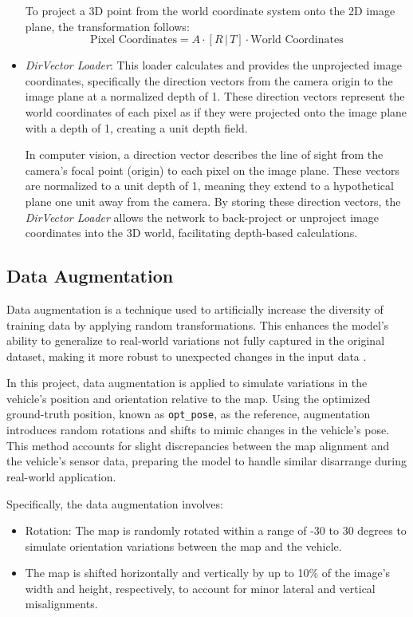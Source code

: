 \begin{itemize}
    To project a 3D point from the world coordinate system onto the 2D image plane, the transformation follows:
    \begin{equation}
        \text{Pixel Coordinates} = A \cdot [R \,|\, T] \cdot \text{World Coordinates}
    \end{equation}
    
    \item \textit{DirVector Loader}: This loader calculates and provides the unprojected image coordinates, specifically the direction vectors from the camera origin to the image plane at a normalized depth of 1. These direction vectors represent the world coordinates of each pixel as if they were projected onto the image plane with a depth of 1, creating a unit depth field.
    
    In computer vision, a direction vector describes the line of sight from the camera’s focal point (origin) to each pixel on the image plane. These vectors are normalized to a unit depth of 1, meaning they extend to a hypothetical plane one unit away from the camera. By storing these direction vectors, the \textit{DirVector Loader} allows the network to back-project or unproject image coordinates into the 3D world, facilitating depth-based calculations.

\end{itemize}

\subsection{Data Augmentation} 

Data augmentation is a technique used to artificially increase the diversity of training data by applying random transformations. This enhances the model’s ability to generalize to real-world variations not fully captured in the original dataset, making it more robust to unexpected changes in the input data \cite{MUMUNI2022100258}.

In this project, data augmentation is applied to simulate variations in the vehicle's position and orientation relative to the map. Using the optimized ground-truth position, known as \texttt{opt\_pose}, as the reference, augmentation introduces random rotations and shifts to mimic changes in the vehicle’s pose. This method accounts for slight discrepancies between the map alignment and the vehicle’s sensor data, preparing the model to handle similar disarrange during real-world application.

Specifically, the data augmentation involves:
\begin{itemize}
    \item Rotation: The map is randomly rotated within a range of -30 to 30 degrees to simulate orientation variations between the map and the vehicle.
    \item The map is shifted horizontally and vertically by up to 10\% of the image’s width and height, respectively, to account for minor lateral and vertical misalignments.
\end{itemize}

